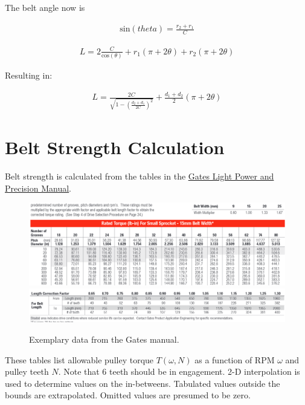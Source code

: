 \documentclass[10pt,letterpaper]{article}
\begin{document}
	The belt angle now is

	\begin{align}
		\text{sin}(theta) = \frac{r_2 + r_1}{C} 
	\end{align}

	\begin{align}
		L = 2 \frac{C}{\text{cos}(\theta)} + r_1 (\pi + 2 \theta) + r_2 (\pi + 2 \theta)
	\end{align}

	Resulting in:

	\begin{align}
		L = \frac{2 C}{\sqrt{1 - (\frac{d_2 + d_1}{2 C})^2}} + \frac{d_1 + d_2}{2} (\pi + 2 \theta)
	\end{align}

	\section{Belt Strength Calculation}

	Belt strength is calculated from the tables in the \href{https://www.gates.com/content/dam/gates/home/resources/resource-library/catalogs/light-power-and-precision-manual.pdf}{\underline{Gates Light Power and Precision Manual}}.

	\begin{figure}[H]
	\includegraphics[width=\textwidth]{beltrating_a.png}
	\includegraphics[width=\textwidth]{beltrating_b.png}
	\caption{Exemplary data from the Gates manual.}
	\end{figure}

	These tables list allowable pulley torque $T(\omega, N)$ as a function of RPM $\omega$ and pulley teeth $N$. Note that 6 teeth should be in engagement.
	2-D interpolation is used to determine values on the in-betweens.
	Tabulated values outside the bounds are extrapolated. Omitted values are presumed to be zero.
\end{document}
